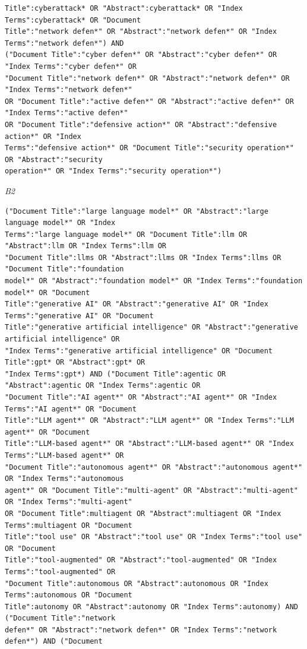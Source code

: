 \begin{lstlisting}
Title":cyberattack* OR "Abstract":cyberattack* OR "Index Terms":cyberattack* OR "Document
Title":"network defen*" OR "Abstract":"network defen*" OR "Index Terms":"network defen*") AND
("Document Title":"cyber defen*" OR "Abstract":"cyber defen*" OR "Index Terms":"cyber defen*" OR
"Document Title":"network defen*" OR "Abstract":"network defen*" OR "Index Terms":"network defen*"
OR "Document Title":"active defen*" OR "Abstract":"active defen*" OR "Index Terms":"active defen*"
OR "Document Title":"defensive action*" OR "Abstract":"defensive action*" OR "Index
Terms":"defensive action*" OR "Document Title":"security operation*" OR "Abstract":"security
operation*" OR "Index Terms":"security operation*")
\end{lstlisting}
\noindent\textit{B2}
\begin{lstlisting}
("Document Title":"large language model*" OR "Abstract":"large language model*" OR "Index
Terms":"large language model*" OR "Document Title":llm OR "Abstract":llm OR "Index Terms":llm OR
"Document Title":llms OR "Abstract":llms OR "Index Terms":llms OR "Document Title":"foundation
model*" OR "Abstract":"foundation model*" OR "Index Terms":"foundation model*" OR "Document
Title":"generative AI" OR "Abstract":"generative AI" OR "Index Terms":"generative AI" OR "Document
Title":"generative artificial intelligence" OR "Abstract":"generative artificial intelligence" OR
"Index Terms":"generative artificial intelligence" OR "Document Title":gpt* OR "Abstract":gpt* OR
"Index Terms":gpt*) AND ("Document Title":agentic OR "Abstract":agentic OR "Index Terms":agentic OR
"Document Title":"AI agent*" OR "Abstract":"AI agent*" OR "Index Terms":"AI agent*" OR "Document
Title":"LLM agent*" OR "Abstract":"LLM agent*" OR "Index Terms":"LLM agent*" OR "Document
Title":"LLM-based agent*" OR "Abstract":"LLM-based agent*" OR "Index Terms":"LLM-based agent*" OR
"Document Title":"autonomous agent*" OR "Abstract":"autonomous agent*" OR "Index Terms":"autonomous
agent*" OR "Document Title":"multi-agent" OR "Abstract":"multi-agent" OR "Index Terms":"multi-agent"
OR "Document Title":multiagent OR "Abstract":multiagent OR "Index Terms":multiagent OR "Document
Title":"tool use" OR "Abstract":"tool use" OR "Index Terms":"tool use" OR "Document
Title":"tool-augmented" OR "Abstract":"tool-augmented" OR "Index Terms":"tool-augmented" OR
"Document Title":autonomous OR "Abstract":autonomous OR "Index Terms":autonomous OR "Document
Title":autonomy OR "Abstract":autonomy OR "Index Terms":autonomy) AND ("Document Title":"network
defen*" OR "Abstract":"network defen*" OR "Index Terms":"network defen*") AND ("Document

\end{lstlisting}
